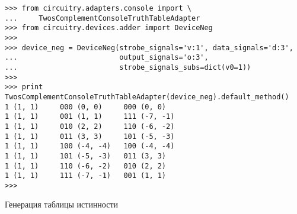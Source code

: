 \documentclass[document.tex]{subfiles}
\begin{document}
\begin{listing}[ht]
\begin{verbatim}
>>> from circuitry.adapters.console import \ 
... 	TwosComplementConsoleTruthTableAdapter
>>> from circuitry.devices.adder import DeviceNeg
>>>
>>> device_neg = DeviceNeg(strobe_signals='v:1', data_signals='d:3',
...                        output_signals='o:3', 
...                        strobe_signals_subs=dict(v0=1))
>>>
>>> print TwosComplementConsoleTruthTableAdapter(device_neg).default_method()
1 (1, 1)     000 (0, 0)     000 (0, 0)     
1 (1, 1)     001 (1, 1)     111 (-7, -1)   
1 (1, 1)     010 (2, 2)     110 (-6, -2)   
1 (1, 1)     011 (3, 3)     101 (-5, -3)   
1 (1, 1)     100 (-4, -4)   100 (-4, -4)   
1 (1, 1)     101 (-5, -3)   011 (3, 3)     
1 (1, 1)     110 (-6, -2)   010 (2, 2)     
1 (1, 1)     111 (-7, -1)   001 (1, 1)   
>>>
\end{verbatim}
\caption{Генерация таблицы истинности}
\label{lst:console2cgen}
\end{listing}
\end{document}
